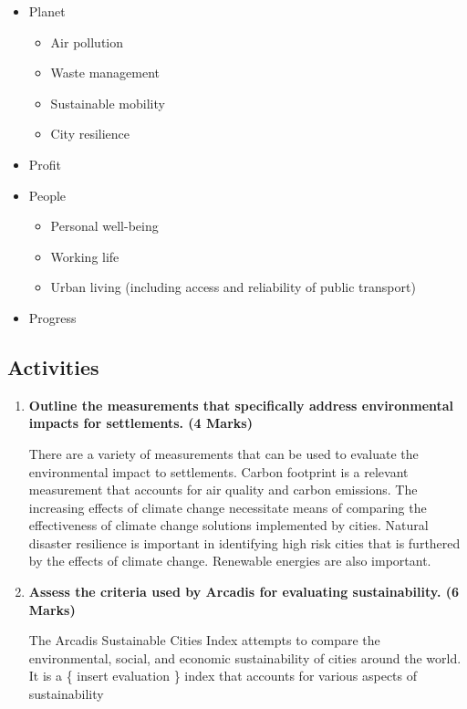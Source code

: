 		\begin{itemize}
			\item Planet
				\begin{itemize}
					\item Air pollution
					\item Waste management
					\item Sustainable mobility
					\item City resilience
				\end{itemize}
			\item Profit

			\item People
				\begin{itemize}
					\item Personal well-being
					\item Working life
					\item Urban living (including access and reliability of public transport)
				\end{itemize}
			\item Progress
		\end{itemize}

	\subsection{Activities}
	
		\begin{enumerate}
			\item \textbf{Outline the measurements that specifically address environmental impacts for settlements. (4 Marks)}

				There are a variety of measurements that can be used to evaluate the environmental impact to settlements. Carbon footprint is a relevant measurement that accounts for air quality and carbon emissions. The increasing effects of climate change necessitate means of comparing the effectiveness of climate change solutions implemented by cities. Natural disaster resilience is important in identifying high risk cities that is furthered by the effects of climate change. Renewable energies are also important.

			\item \textbf{Assess the criteria used by Arcadis for evaluating sustainability. (6 Marks)}

				The Arcadis Sustainable Cities Index attempts to compare the environmental, social, and economic sustainability of cities around the world. It is a \{ insert evaluation \} index that accounts for various aspects of sustainability 
		\end{enumerate}

